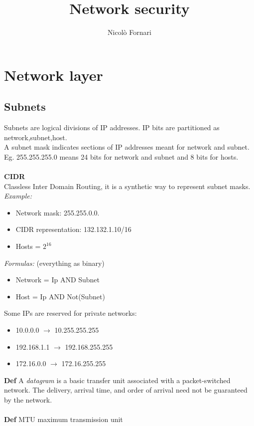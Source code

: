 \documentclass[10pt,a4paper]{book}
\author{Nicolò Fornari}
\title{Network security}
\begin{document}
\maketitle
\chapter{Network layer}
\section{Subnets}
Subnets are logical divisions of IP addresses. IP bits are partitioned as network,subnet,host.\\
A subnet mask indicates sections of IP addresses meant for network and subnet.\\
Eg. 255.255.255.0 means 24 bits for network and subnet and 8 bits for hosts.\\\\
\textbf{CIDR}\\
Classless Inter Domain Routing, it is a synthetic way to represent subnet masks.\\
\emph{Example: }
\begin{itemize}
\item Network mask: 255.255.0.0.
\item CIDR representation: 132.132.1.10/16
\item Hosts = $2^{16}$
\end{itemize}
\emph{Formulas:} (everything as binary)
\begin{itemize}
\item Network = Ip AND Subnet
\item Host = Ip AND Not(Subnet)
\end{itemize}
Some IPs are reserved for private networks:
\begin{itemize}
\item 10.0.0.0 $\to$ 10.255.255.255
\item 192.168.1.1 $\to$ 192.168.255.255
\item 172.16.0.0 $\to$ 172.16.255.255
\end{itemize}
\textbf{Def} A \emph{datagram} is a basic transfer unit associated with a packet-switched network. The delivery, arrival time, and order of arrival need not be guaranteed by the network.\\\\
\textbf{Def} MTU maximum transmission unit
\newpage
\end{document}
